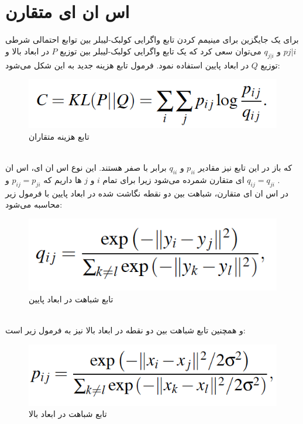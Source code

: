 \section{اس ان ای متقارن}
برای یک جایگزین برای مینیمم کردن تابع واگرایی کولبک-لیبلر بین توابع احتمالی شرطی
$p{j|i}$
و
$q_{j|i}$
می‌توان سعی کرد که یک تابع واگرایی کولبک-لیبلر بین توزیع $P$ در ابعاد بالا و توزیع $Q$ در ابعاد پایین استفاده نمود.
فرمول تابع هزینه جدید به این شکل می‌شود:
\begin{figure}[!h]
	\centering\includegraphics[scale=.3]{eq8}
	\caption{تابع هزینه متقاران}\label{fig.eq8}
\end{figure}
\\
که باز در این تابع نیز مقادیر $p_{ii}$ و $q_{ii}$ برابر با صفر هستند.
این نوع اس ان ای، اس ان ای متقارن شمرده می‌شود زیرا برای تمام $i$ و $j$ ها داریم که
$p_{ij} = p_{ji}$
و 
$q_{ij} = q_{ji}$
.
\\
در اس ان ای متقارن، شباهت بین دو نقطه نگاشت شده در ابعاد پایین با فرمول زیر محاسبه می‌شود:
 \begin{figure}[!h]
 	\centering\includegraphics[scale=.3]{eq9}
 	\caption{تابع شباهت در ابعاد پایین}\label{fig.eq9}
 \end{figure}
\\
و همچنین تابع شباهت بین دو نقطه در ابعاد بالا نیز به فرمول زیر است:
\begin{figure}[!h]
	\centering\includegraphics[scale=.3]{eq10}
	\caption{تابع شباهت در ابعاد بالا}\label{fig.eq10}
\end{figure}
